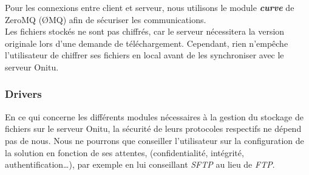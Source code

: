 Pour les connexions entre client et serveur, nous utilisons le module \textbf{\emph{curve}} de ZeroMQ (ØMQ) afin de sécuriser les communications.\\

Les fichiers stockés ne sont pas chiffrés, car le serveur nécessitera la version originale lors d'une demande de téléchargement. Cependant, rien n'empêche l'utilisateur de chiffrer ses fichiers en local avant de les synchroniser avec le serveur Onitu.
\subsubsection{Drivers}
En ce qui concerne les différents modules nécessaires à la gestion du stockage de fichiers sur le serveur Onitu, la sécurité de leurs protocoles respectifs ne dépend pas de nous. Nous ne pourrons que conseiller l'utilisateur sur la configuration de la solution en fonction de ses attentes, (confidentialité, intégrité, authentification…), par exemple en lui conseillant \textit{SFTP} au lieu de \textit{FTP}.
